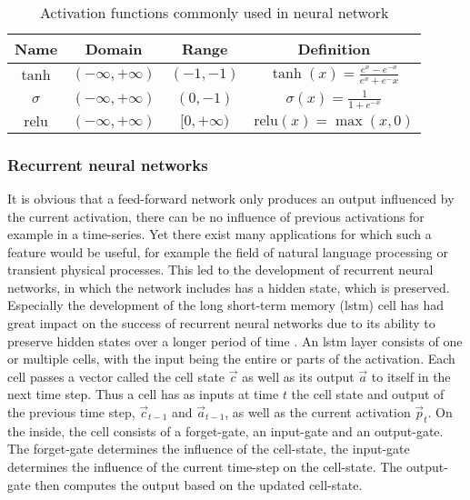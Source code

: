 \begin{table}
	\centering
	\caption{Activation functions commonly used in neural network}
	\begin{tabular}{c|c|c|c}
		\hline \hline
		Name & Domain & Range & Definition \\
		\hline
		$\tanh$ & $ (-\infty, + \infty)$ & $(-1, -1)$ & $\tanh(x) = \frac{e^x - e^{-x}}{e^x + e^-x}$ \\
		\hline
		$\sigma$ & $(-\infty, + \infty)$ & $(0, -1 )$ & $\sigma(x) = \frac{1}{1 + e^{-x}} $ \\ \hline
		$\mathrm{relu}$ & $(-\infty, + \infty)$ & $[0, +\infty)$  & $\mathrm{relu}(x) = \max(x,0)$ \\\hline \hline
	\end{tabular}\label{tab:activations}
\end{table}
\subsubsection{Recurrent neural networks}
It is obvious that a feed-forward network only produces an output influenced by the current activation, there can be no influence of previous activations for example in a time-series. Yet there exist many applications for which such a feature would be useful, for example the field of natural language processing \cite{ghosh_contextual_2016} or transient physical processes. This led to the development of recurrent neural networks, in which the network includes has a hidden state, which is preserved. Especially the development of the long short-term memory (lstm)  cell has had great impact on the success of recurrent neural networks due to its ability to preserve hidden states over a longer period of time \cite{hochreiter_long_1997}. An lstm layer consists of one or multiple cells, with the input being the entire or parts of the activation. Each cell passes a vector called the cell state $\vec{c}$ as well as its output $\vec{a}$ to itself in the next time step. Thus a cell has as inputs at time $t$ the cell state and output of the previous time step, $\vec{c}_{t-1}$ and $\vec{a}_{t-1}$, as well as the current activation $\vec{p}_t$. On the inside, the cell consists of a forget-gate, an input-gate and an output-gate. The forget-gate determines the influence of the cell-state, the input-gate determines the influence of the current time-step on the cell-state. The output-gate then computes the output based on the updated cell-state.
\begin{figure}
	\centering
	\def\svgwidth{0.5 \textwidth}
	
\end{figure} 

